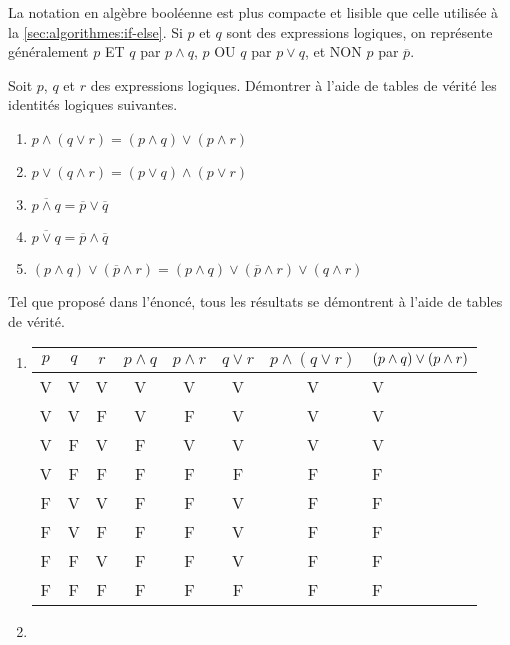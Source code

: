 \begin{exercice}
  La notation en algèbre booléenne est plus compacte et lisible que
  celle utilisée à la \autoref{sec:algorithmes:if-else}. Si $p$ et $q$
  sont des expressions logiques, on représente généralement $p$ ET $q$
  par $p \wedge q$, $p$ OU $q$ par $p \vee q$, et NON $p$ par
  $\overline{p}$.

  Soit $p$, $q$ et $r$ des expressions logiques. Démontrer à l'aide de
  tables de vérité les identités logiques suivantes.
  \begin{enumerate}
  \item $p \wedge (q \vee r) = (p \wedge q) \vee (p \wedge r)$
  \item $p \vee (q \wedge r) = (p \vee q) \wedge (p \vee r)$
  \item $\overline{p \wedge q} = \overline{p} \vee \overline{q}$
  \item $\overline{p \vee q} = \overline{p} \wedge \overline{q}$
  \item $(p \wedge q) \vee (\overline{p} \wedge r) = (p \wedge q) \vee (\overline{p} \wedge
    r) \vee (q \wedge r)$
  \end{enumerate}
  \begin{sol}
    Tel que proposé dans l'énoncé, tous les résultats se démontrent à
    l'aide de tables de vérité.
    \begin{enumerate}
    \item
      \begin{tabularx}{\linewidth}{*{7}{c}>{\centering\arraybackslash}X}
        \toprule
        $p$ & $q$ & $r$ & $p \wedge q$ & $p \wedge r$ & $q \vee r$ & $p \wedge (q \vee r)$ & $(p \wedge q) \newline\vee (p \wedge r)$
        \\
        \midrule
        V & V & V & V & V & V & V & V \\
        V & V & F & V & F & V & V & V \\
        V & F & V & F & V & V & V & V \\
        V & F & F & F & F & F & F & F \\
        F & V & V & F & F & V & F & F \\
        F & V & F & F & F & V & F & F \\
        F & F & V & F & F & V & F & F \\
        F & F & F & F & F & F & F & F \\
        \bottomrule
      \end{tabularx}
    \item

\end{enumerate}
\end{sol}
\end{exercice}
